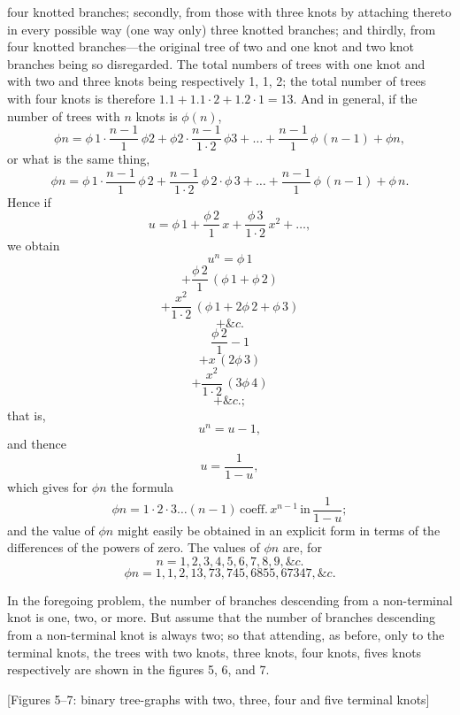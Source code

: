 \documentclass[11pt,a4paper]{book}
\begin{document}
\noindent
four knotted branches; secondly, from those with three knots by attaching thereto in every possible way (one way only) three knotted branches; and thirdly, from four knotted branches---the original tree of two and one knot and two knot branches being so disregarded. The total numbers of trees with one knot and with two and three knots being respectively 1, 1, 2; the total number of trees with four knots is therefore $1.1 + 1.1\cdot 2 + 1.2 \cdot 1 = 13$. And in general, if the number of trees with $n$ knots is $\phi(n)$,
\[
\phi n = \phi\,1\cdot\frac{n-1}{1}\,\phi 2 + \phi 2 \cdot\frac{n-1}{1\cdot 2}\,\phi 3 + \ldots + \frac{n-1}{1}\,\phi\,(n-1) + \phi n,
\]
or what is the same thing,
\[
\phi n = \phi\,1\cdot\frac{n-1}{1}\,\phi\,2 + \frac{n-1}{1\cdot 2}\,\phi\,2 \cdot \phi\,3 + \ldots + \frac{n-1}{1}\,\phi\,(n-1) + \phi\,n.
\]
Hence if
\[
u = \phi\,1 + \frac{\phi\,2}{1}\,x + \frac{\phi\,3}{1\cdot 2}\,x^2 + \ldots,
\]
we obtain
\[
u^n = \phi\,1
\]
\[
+ \frac{\phi\,2}{1}\,(\phi\,1 + \phi\,2)
\]
\[
+ \frac{x^2}{1\cdot 2}\,(\phi\,1 + 2\phi\,2 + \phi\,3)
\]
\[
+ \&c.
\]
\[
\frac{\phi\,2}{1} - 1
\]
\[
+ x\,(2\phi\,3)
\]
\[
+ \frac{x^2}{1\cdot 2}\,(3\phi\,4)
\]
\[
+ \&c.;
\]
that is,
\[
u^n = u - 1,
\]
and thence
\[
u = \frac{1}{1-u},
\]
which gives for $\phi n$ the formula
\[
\phi n = 1\cdot 2\cdot 3 \ldots (n-1)\,\text{coeff.}\,x^{n-1}\,\text{in}\,\frac{1}{1-u};
\]
and the value of $\phi n$ might easily be obtained in an explicit form in terms of the differences of the powers of zero. The values of $\phi n$ are, for
\[
n = 1, 2, 3, 4, 5, 6, 7, 8, 9, \&c.
\]
\[
\phi n = 1, 1, 2, 13, 73, 745, 6855, 67347, \&c.
\]

\setcounter{page}{114}

In the foregoing problem, the number of branches descending from a non-terminal knot is one, two, or more. But assume that the number of branches descending from a non-terminal knot is always two; so that attending, as before, only to the terminal knots, the trees with two knots, three knots, four knots, fives knots respectively are shown in the figures 5, 6, and 7.

\begin{center}
[Figures 5--7: binary tree-graphs with two, three, four and five terminal knots]
\end{center}
\end{document}
